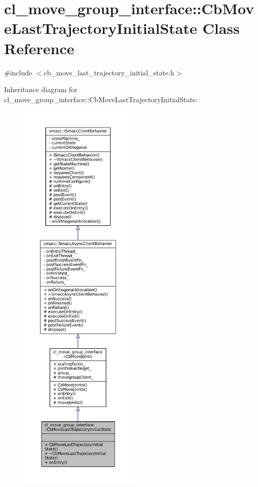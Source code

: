 \hypertarget{classcl__move__group__interface_1_1CbMoveLastTrajectoryInitialState}{}\section{cl\+\_\+move\+\_\+group\+\_\+interface\+:\+:Cb\+Move\+Last\+Trajectory\+Initial\+State Class Reference}
\label{classcl__move__group__interface_1_1CbMoveLastTrajectoryInitialState}


{\ttfamily \#include $<$cb\+\_\+move\+\_\+last\+\_\+trajectory\+\_\+initial\+\_\+state.\+h$>$}



Inheritance diagram for cl\+\_\+move\+\_\+group\+\_\+interface\+:\+:Cb\+Move\+Last\+Trajectory\+Initial\+State\+:
\nopagebreak
\begin{figure}[H]
\begin{center}
\leavevmode
\includegraphics[height=550pt]{classcl__move__group__interface_1_1CbMoveLastTrajectoryInitialState__inherit__graph}
\end{center}
\end{figure}


